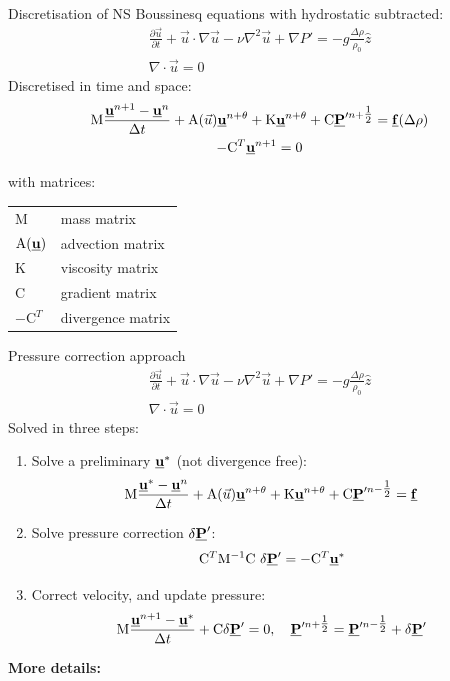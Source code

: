 \documentclass[12pt]{beamer}
\newcommand\pp[2]{\frac{\partial #1}{\partial #2}}
\newcommand\ppt[1]{\pp{#1}t}
\newcommand\grad\nabla
\renewcommand\div{\nabla\cdot}
\newcommand\mat[1]{\mathrm{#1}}
\newcommand\dv[1]{\underline{\bf #1}} %
\newcommand\vu{\dv u}
\newcommand\vf{\dv f}
\newcommand\vp{\dv P'}
\begin{document}
\begin{frame}{Discretisation of NS}
  Boussinesq equations with hydrostatic subtracted:
  \begin{gather*}
    \ppt{\vec u} + \vec u\cdot\grad\vec u - \nu \nabla^2 \vec u 
    + \grad P' = -g \frac{\Delta\rho}{\rho_0} \hat z \\
    \div \vec u =0
  \end{gather*}
  Discretised in time and space:
  \begin{gather*}
    \mat M\frac{\vu^{n+1}-\vu^n}{\Delta t} + \mat A(\vec u)\vu^{n+\theta}
    + \mat K \vu^{n+\theta}
    + \mat C\vp^{n+\tfrac 12} = \vf(\Delta\rho) \\
    -\mat C^T \vu^{n+1} = 0
  \end{gather*}
  \vspace{-1em}
  \begin{exampleblock}{}
    with matrices:
    \begin{tabular}{ll}
      $\mat M$ & mass matrix \\
      $\mat A(\vu)$ & advection matrix \\
      $\mat K$ & viscosity matrix \\
      $\mat C$ & gradient matrix \\
      $-\mat C^T$ & divergence matrix \\
    \end{tabular}
  \end{exampleblock}
\end{frame}
\begin{frame}{Pressure correction approach}
  \vspace{-1em}
  \begin{gather*}
    \ppt{\vec u} + \vec u\cdot\grad\vec u - \nu \nabla^2 \vec u 
    + \grad P' = -g \frac{\Delta\rho}{\rho_0} \hat z \\
    \div \vec u =0
  \end{gather*}
  Solved in three steps:
  \begin{enumerate}
    \item Solve a preliminary $\vu^{\ast}$ (not divergence free):
      \begin{equation*}
        \mat M\frac{\vu^\ast-\vu^n}{\Delta t} + \mat A(\vec u)\vu^{n+\theta} +
        \mat K \vu^{n+\theta}
        + \mat C\vp^{n-\tfrac 12} = \vf
      \end{equation*}
    \item Solve pressure correction $\delta\vp$:
      \begin{equation*}
        \mat C^T \mat M^{-1} \mat C ~ \delta\vp = -\mat C^T \vu^*
      \end{equation*}
    \item Correct velocity, and update pressure:
      \begin{equation*}
        \mat M\frac{\vu^{n+1}-\vu^\ast}{\Delta t} + \mat C\delta\vp =0,\quad
        \vp^{n+\tfrac 12} = \vp^{n-\tfrac 12} + \delta\vp
      \end{equation*}
  \end{enumerate}
  {\small{\bf More details:}\citet{Gresho1998}}
\end{frame}
\end{document}
